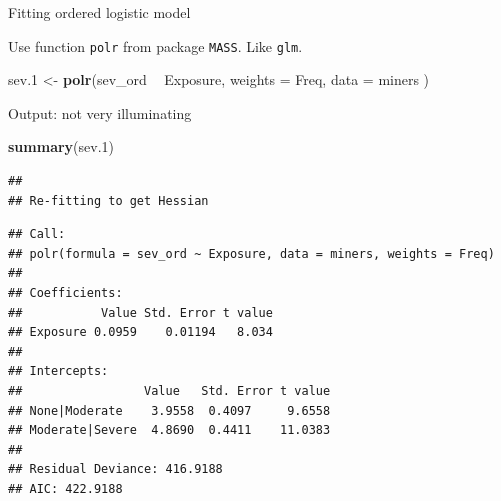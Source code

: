 \documentclass[
  ignorenonframetext,
]{beamer}
\newenvironment{Shaded}{\begin{snugshade}}{\end{snugshade}}
\newcommand{\DataTypeTok}[1]{\textcolor[rgb]{0.13,0.29,0.53}{#1}}
\newcommand{\FloatTok}[1]{\textcolor[rgb]{0.00,0.00,0.81}{#1}}
\newcommand{\KeywordTok}[1]{\textcolor[rgb]{0.13,0.29,0.53}{\textbf{#1}}}
\newcommand{\NormalTok}[1]{#1}
\newcommand{\OperatorTok}[1]{\textcolor[rgb]{0.81,0.36,0.00}{\textbf{#1}}}
\newcommand{\StringTok}[1]{\textcolor[rgb]{0.31,0.60,0.02}{#1}}
\begin{document}
\begin{frame}[fragile]{Fitting ordered logistic model}
\protect\hypertarget{fitting-ordered-logistic-model}{}

Use function \texttt{polr} from package \texttt{MASS}. Like
\texttt{glm}.

\begin{Shaded}
\begin{Highlighting}[]
\NormalTok{sev}\FloatTok{.1}\NormalTok{ <-}\StringTok{ }\KeywordTok{polr}\NormalTok{(sev_ord }\OperatorTok{~}\StringTok{ }\NormalTok{Exposure,}
  \DataTypeTok{weights =}\NormalTok{ Freq,}
  \DataTypeTok{data =}\NormalTok{ miners}
\NormalTok{)}
\end{Highlighting}
\end{Shaded}

\end{frame}

\begin{frame}[fragile]{Output: not very illuminating}
\protect\hypertarget{output-not-very-illuminating}{}

\scriptsize

\begin{Shaded}
\begin{Highlighting}[]
\KeywordTok{summary}\NormalTok{(sev}\FloatTok{.1}\NormalTok{)}
\end{Highlighting}
\end{Shaded}

\begin{verbatim}
## 
## Re-fitting to get Hessian
\end{verbatim}

\begin{verbatim}
## Call:
## polr(formula = sev_ord ~ Exposure, data = miners, weights = Freq)
## 
## Coefficients:
##           Value Std. Error t value
## Exposure 0.0959    0.01194   8.034
## 
## Intercepts:
##                 Value   Std. Error t value
## None|Moderate    3.9558  0.4097     9.6558
## Moderate|Severe  4.8690  0.4411    11.0383
## 
## Residual Deviance: 416.9188 
## AIC: 422.9188
\end{verbatim}

\normalsize

\end{frame}
\end{document}

